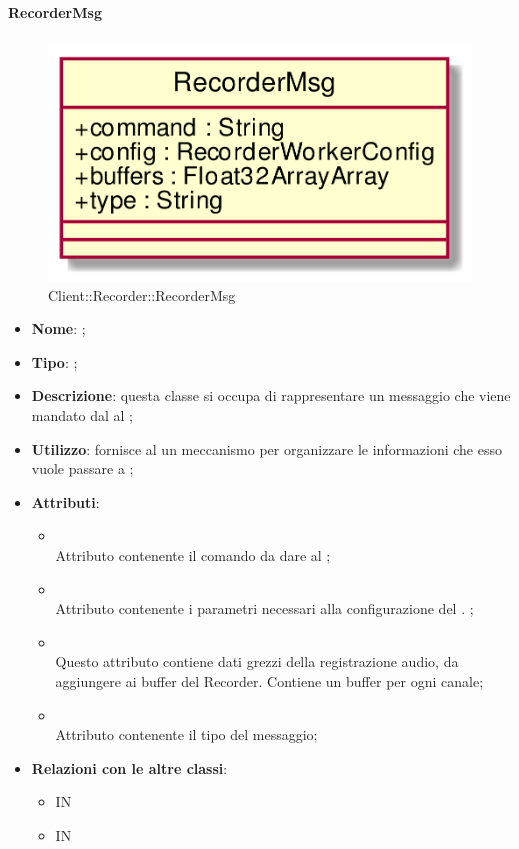 \hypertarget{RecorderMsg_label}{\paragraph{RecorderMsg}}
\begin{figure}[h]
	\centering
	\includegraphics[width=\textwidth,height=\textheight,keepaspectratio]{images/ClassRecorderMsg.png}
	\caption{Client::Recorder::RecorderMsg}
\end{figure}
\begin{itemize}
	\item \textbf{Nome}: ;
	\item \textbf{Tipo}: ;
	\item \textbf{Descrizione}: questa classe si occupa di rappresentare un messaggio che viene mandato dal  al ;
	\item \textbf{Utilizzo}: fornisce al  un meccanismo per organizzare le informazioni che esso vuole passare a ;
	\item \textbf{Attributi}:
	\begin{itemize}
		\item[]  \\
		Attributo contenente il comando da dare al ;
		\item[]  \\
		Attributo contenente i parametri necessari alla configurazione del . ;
		\item[]  \\
		Questo attributo contiene dati grezzi della registrazione audio, da aggiungere ai buffer del Recorder. Contiene un buffer per ogni canale;
		\item[]  \\
		Attributo contenente il tipo del messaggio;
	\end{itemize}
	\item \textbf{Relazioni con le altre classi}:
	\begin{itemize}
		\item IN \hyperlink{RecorderWorker_label}{}
		\item IN \hyperlink{Recorder_label}{}
	\end{itemize}
\end{itemize}

